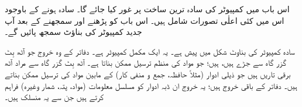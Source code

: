 اس باب میں کمپیوٹر کی سادہ ترین ساخت پر غور کیا جائے گا۔ سادہ ہونے کے باوجود اس میں   کئی   اعلٰی  تصورات شامل ہیں۔ اس باب کو پڑھنے اور   سمجھنے  کے بعد آپ جدید کمپیوٹر کی بناؤٹ سمجھ پائیں گے۔

سادہ کمپیوٹر کی  بناوٹ شکل  میں پیش ہے۔ یہ ایک مکمل کمپیوٹر ہے۔   دفاتر کے    وہ خروج جو آٹھ بِٹ گزر گاہ     سے جڑے ہیں،      ہیں؛  جو  مواد کی  منظم ترسیل ممکن بناتا  ہے۔ آٹھ بِٹ  گزر گاہ سے مراد آٹھ برقی تاریں ہیں جو    ذیلی ادوار (مثلاً حافظہ، جمع و منفی کار)  کے مابین مواد کی ترسیل ممکن بناتے ہیں۔ دفاتر کے باقی خروج  ہیں؛ یہ خروج   ان ڈبہ ادوار کو مسلسل   معلومات (مواد، پتہ، شمار وغیرہ)  فراہم کرتے ہیں جن سے یہ منسلک ہیں۔

